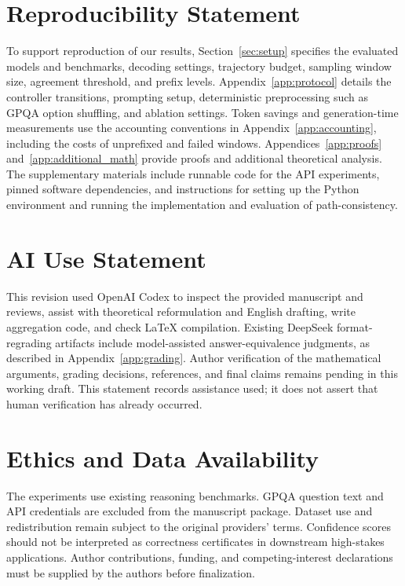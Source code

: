 \section*{Reproducibility Statement}
To support reproduction of our results, Section~\ref{sec:setup} specifies the evaluated models and benchmarks, decoding settings, trajectory budget, sampling window size, agreement threshold, and prefix levels. Appendix~\ref{app:protocol} details the controller transitions, prompting setup, deterministic preprocessing such as GPQA option shuffling, and ablation settings. Token savings and generation-time measurements use the accounting conventions in Appendix~\ref{app:accounting}, including the costs of unprefixed and failed windows. Appendices~\ref{app:proofs} and~\ref{app:additional_math} provide proofs and additional theoretical analysis. The supplementary materials include runnable code for the API experiments, pinned software dependencies, and instructions for setting up the Python environment and running the implementation and evaluation of path-consistency.

\section*{AI Use Statement}
This revision used OpenAI Codex to inspect the provided manuscript and reviews, assist with theoretical reformulation and English drafting, write aggregation code, and check LaTeX compilation. Existing DeepSeek format-regrading artifacts include model-assisted answer-equivalence judgments, as described in Appendix~\ref{app:grading}. Author verification of the mathematical arguments, grading decisions, references, and final claims remains pending in this working draft. This statement records assistance used; it does not assert that human verification has already occurred.

\section*{Ethics and Data Availability}
The experiments use existing reasoning benchmarks. GPQA question text and API credentials are excluded from the manuscript package. Dataset use and redistribution remain subject to the original providers' terms. Confidence scores should not be interpreted as correctness certificates in downstream high-stakes applications. Author contributions, funding, and competing-interest declarations must be supplied by the authors before finalization.

